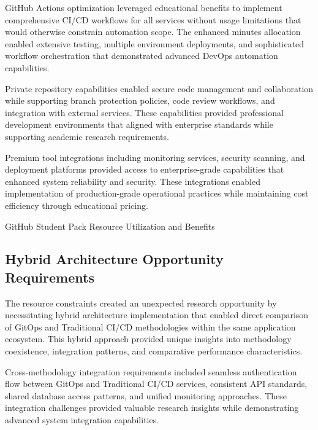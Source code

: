 GitHub Actions optimization leveraged educational benefits to implement comprehensive CI/CD workflows for all services without usage limitations that would otherwise constrain automation scope. The enhanced minutes allocation enabled extensive testing, multiple environment deployments, and sophisticated workflow orchestration that demonstrated advanced DevOps automation capabilities.

Private repository capabilities enabled secure code management and collaboration while supporting branch protection policies, code review workflows, and integration with external services. These capabilities provided professional development environments that aligned with enterprise standards while supporting academic research requirements.

Premium tool integrations including monitoring services, security scanning, and deployment platforms provided access to enterprise-grade capabilities that enhanced system reliability and security. These integrations enabled implementation of production-grade operational practices while maintaining cost efficiency through educational pricing.

\begin{table}[H]
\centering
\caption{GitHub Student Pack Resource Utilization and Benefits}
\label{tab:github-student-benefits}
\end{table}

\subsection{Hybrid Architecture Opportunity Requirements}

The resource constraints created an unexpected research opportunity by necessitating hybrid architecture implementation that enabled direct comparison of GitOps and Traditional CI/CD methodologies within the same application ecosystem. This hybrid approach provided unique insights into methodology coexistence, integration patterns, and comparative performance characteristics.

Cross-methodology integration requirements included seamless authentication flow between GitOps and Traditional CI/CD services, consistent API standards, shared database access patterns, and unified monitoring approaches. These integration challenges provided valuable research insights while demonstrating advanced system integration capabilities.

